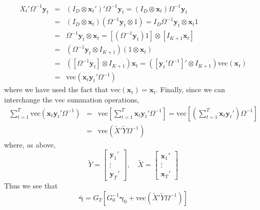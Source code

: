 \documentclass[12pt]{article}
\begin{document}
\begin{eqnarray*}
  X_t' \Omega^{-1} \mathbf{y}_t &=&  \left( I_D \otimes \mathbf{x}_t' \right)' \Omega^{-1} \mathbf{y}_t  = \left( I_D \otimes \mathbf{x}_t \right)\Omega^{-1}\mathbf{y}_t \\
  &=& \left( I_D \otimes \mathbf{x}_t \right)\left( \Omega^{-1} \mathbf{y}_t \otimes 1 \right) = I_D \Omega^{-1} \mathbf{y}_t \otimes \mathbf{x}_t 1\\
  &=&  \Omega^{-1}\mathbf{y}_t \otimes \mathbf{x}_t = \left[\left( \Omega^{-1}\mathbf{y}_t \right)1\right] \otimes \left[I_{K+1} \mathbf{x}_t\right] \\
  &=& \left( \Omega^{-1} \mathbf{y}_t \otimes I_{K+1} \right)\left( 1 \otimes \mathbf{x}_t \right)\\
  &=& \left( \left[\Omega^{-1} \mathbf{y}_t\right] \otimes I_{K+1}\right) \mathbf{x}_t = \left( \left[\mathbf{y}_t'\Omega^{-1} \right]' \otimes I_{K+1}\right) \mbox{vec}(\mathbf{x}_t)\\
  &=& \mbox{vec}\left( \mathbf{x}_t \mathbf{y}_t' \Omega^{-1} \right)
\end{eqnarray*}
where we have used the fact that $\mbox{vec}\left( \mathbf{x}_t \right) = \mathbf{x}_t$.
Finally, since we can interchange the $\mbox{vec}$ summation operations,
\begin{eqnarray*}
  \sum_{t=1}^{T} \mbox{vec}\left( \mathbf{x}_t \mathbf{y}_t' \Omega^{-1} \right) &=&  \mbox{vec}\left[ \sum_{t=1}^{T} \mathbf{x}_t \mathbf{y}_t' \Omega^{-1} \right] =  \mbox{vec}\left[ \left(\sum_{t=1}^{T} \mathbf{x}_t \mathbf{y}_t' \right)\Omega^{-1} \right] \\
  &=& \mbox{vec}\left( \widetilde{X}' \widetilde{Y} \Omega^{-1} \right)
\end{eqnarray*}
where, as above, 
\begin{equation*}
  \widetilde{Y} = \left[
  \begin{array}{c}
    \mathbf{y}_1'\\
    \vdots \\
    \mathbf{y}_T'
  \end{array}
\right], \quad \widetilde{X} = \left[
\begin{array}{c}
  \mathbf{x}_{1}' \\
  \vdots \\
  \mathbf{x}_{T}' 
\end{array}
\right]
\end{equation*}
Thus we see that
\begin{equation*}
  \bar{\boldsymbol{\gamma}} = G_T \left[ G_0^{-1}\boldsymbol{\gamma}_0 +\mbox{vec}\left( \widetilde{X}' \widetilde{Y} \Omega^{-1} \right) \right]
\end{equation*}
\end{document}
